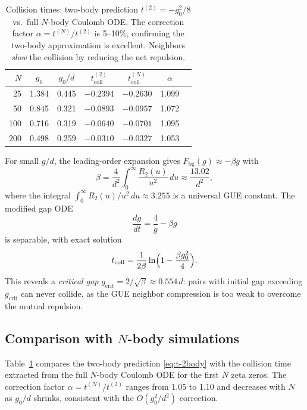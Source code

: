 \documentclass[11pt,a4paper]{article}
\begin{document}
\begin{table}[t]
\centering
\begin{tabular}{@{}rcccccc@{}}
\toprule
$N$ & $g_0$ & $g_0/d$ & $t_{\mathrm{coll}}^{(2)}$ & $t_{\mathrm{coll}}^{(N)}$ & $\alpha$ \\
\midrule
25  & 1.384 & 0.445 & $-0.2394$ & $-0.2630$ & 1.099 \\
50  & 0.845 & 0.321 & $-0.0893$ & $-0.0957$ & 1.072 \\
100 & 0.716 & 0.319 & $-0.0640$ & $-0.0701$ & 1.095 \\
200 & 0.498 & 0.259 & $-0.0310$ & $-0.0327$ & 1.053 \\
\bottomrule
\end{tabular}
\caption{Collision times: two-body prediction
  $t^{(2)} = -g_0^2/8$ vs.\ full $N$-body Coulomb ODE. The
  correction factor $\alpha = t^{(N)}/t^{(2)}$ is 5--10\%, confirming
  the two-body approximation is excellent. Neighbors \emph{slow} the
  collision by reducing the net repulsion.}
\label{tab:collision}
\end{table}

For small $g/d$, the leading-order expansion gives
$F_{\mathrm{bg}}(g) \approx -\beta g$ with
\[
  \beta = \frac{4}{d^2}\int_0^\infty \frac{R_2(u)}{u^2}\,du
  \approx \frac{13.02}{d^2},
\]
where the integral $\int_0^\infty R_2(u)/u^2\,du \approx 3.255$ is a
universal GUE constant. The modified gap ODE
\begin{equation}\label{eq:modified-ode}
  \frac{dg}{dt} = \frac{4}{g} - \beta g
\end{equation}
is separable, with exact solution
\begin{equation}\label{eq:t-corrected}
  t_{\mathrm{coll}} = \frac{1}{2\beta}\ln\Bigl(1 - \frac{\beta g_0^2}{4}\Bigr).
\end{equation}
This reveals a \emph{critical gap} $g_{\mathrm{crit}} =
2/\sqrt{\beta} \approx 0.554\,d$: pairs with initial gap exceeding
$g_{\mathrm{crit}}$ can never collide, as the GUE neighbor
compression is too weak to overcome the mutual repulsion.

\subsection{Comparison with $N$-body simulations}

Table~\ref{tab:collision} compares the two-body prediction
\eqref{eq:t-2body} with the collision time extracted from the full
$N$-body Coulomb ODE for the first $N$ zeta zeros. The correction
factor $\alpha = t^{(N)}/t^{(2)}$ ranges from 1.05 to 1.10 and
decreases with $N$ as $g_0/d$ shrinks, consistent with the $O(g_0^2
/ d^2)$ correction.
\end{document}
